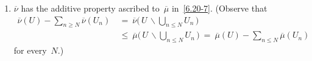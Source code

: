 \documentclass[main.tex]{subfiles}
\begin{document}
\begin{psec}{6.20}
\begin{enumerate}
If $A,B\in\mathcal A$
and $\hat A=\hat B$,
then (see~\ref{6.20-3})
we have $\mu(A\backslash B)=\mu(B\backslash A)=0$,
and therefore $\nu(A\backslash B)= \nu(B\backslash A)=0$;
by the argument of~\ref{6.20-3}
this implies $\nu(A)=\nu(B)$.
Hence, the formula
\begin{equation*}
\overline\nu(\hat A)\ :=\ \nu(A)\qquad(A\in\mathcal A)
\end{equation*}
defines an (additive) function~$\overline\nu$ on $\clopen(Y)$ with
\begin{equation*}
\overline\nu(U)\ \leq\ \overline\mu(U)\qquad(U\in\clopen(U)\,)\htam{.}
\end{equation*}
%
\item\label{6.20-9}
$\overline\nu$ has the additive property ascribed to~$\overline\mu$
in~\ref{6.20-7}.
(Observe that 
\begin{alignat*}{2}
\textstyle\overline\nu(U)-\sum_{n\geq N} \overline\nu(U_n)
\ &=\    \overline\nu\bigl(\,U\,\backslash
          \textstyle\bigcup_{n\leq N}U_n\,\bigr) \\
\ &\leq\ \overline\mu\bigl(\,U\,\backslash
          \textstyle \bigcup_{n\leq N}U_n\,\bigr)
\ =\     \overline\mu(U)-\sum_{n\leq N}\overline\mu(U_n)
\end{alignat*}
for every~$N$.)
\end{enumerate}
\end{psec}
%
%
\end{document}
